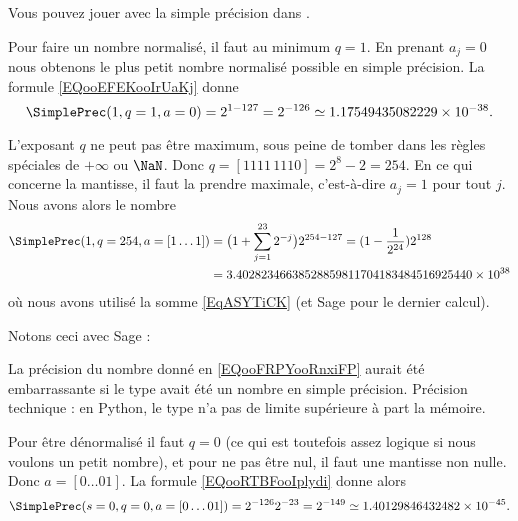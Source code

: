 Vous pouvez jouer avec la simple précision dans \cite{ooOSFYooHCgMRL}.

\begin{example}
	Pour faire un nombre normalisé, il faut au minimum \( q=1\). En prenant \( a_j=0\) nous obtenons le plus petit nombre normalisé possible en simple précision. La formule \eqref{EQooEFEKooIrUaKj} donne
	\begin{equation}
		\SimplePrec(1,q=1,a=0)=2^{1-127}=2^{-126}\simeq 1.17549435082229\times 10^{-38}.
	\end{equation}
\end{example}

\begin{example}
	L'exposant \( q\) ne peut pas être maximum, sous peine de tomber dans les règles spéciales de \( +\infty\) ou \( \NaN\). Donc \( q=[1111\,1110]=2^{8}-2=254\). En ce qui concerne la mantisse, il faut la prendre maximale, c'est-à-dire \( a_j=1\) pour tout \( j\). Nous avons alors le nombre
	\begin{subequations}
		\begin{align}
			\SimplePrec(1,q=254,a=[1\ldots 1]) & =\big( 1+\sum_{j=1}^{23}2^{-j} \big)2^{254-127}=(1-\frac{1}{ 2^{24} })2^{128}     \\
			                                   & =3.40282346638528859811704183484516925440\times 10^{38}  \label{EQooFRPYooRnxiFP}
		\end{align}
	\end{subequations}
	où nous avons utilisé la somme \eqref{EqASYTiCK} (et Sage pour le dernier calcul).
\end{example}

Notons ceci avec Sage :


La précision du nombre donné en \eqref{EQooFRPYooRnxiFP} aurait été embarrassante si le type avait été un nombre en simple précision. Précision technique : en Python, le type  n'a pas de limite supérieure à part la mémoire.

\begin{example}
	Pour être dénormalisé il faut \( q=0\) (ce qui est toutefois assez logique si nous voulons un petit nombre), et pour ne pas être nul, il faut une mantisse non nulle. Donc \( a=[0\ldots 01]\). La formule \eqref{EQooRTBFooIplydi} donne alors
	\begin{equation}
		\SimplePrec(s=0,q=0,a=[0\ldots 01])=2^{-126}2^{-23}=2^{-149}\simeq 1.40129846432482\times 10^{-45}.
	\end{equation}
\end{example}

